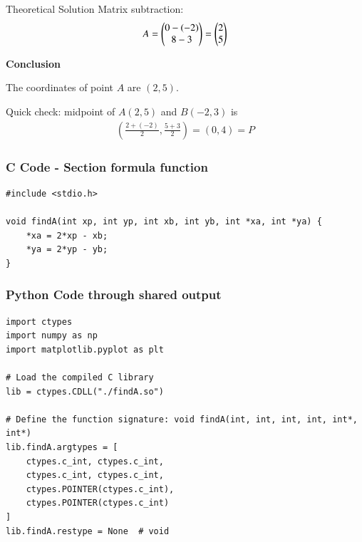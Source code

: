 \documentclass{beamer}
\begin{document}
\begin{frame}{Theoretical Solution}
    Matrix subtraction:  
\begin{align*}
A = \begin{pmatrix}0 - (-2) \\ 8 - 3\end{pmatrix} 
= \begin{pmatrix}2 \\ 5\end{pmatrix}    
\end{align*}



\textbf{Conclusion} 

The coordinates of point $A$ are $(2,5)$.  

Quick check: midpoint of $A(2,5)$ and $B(-2,3)$ is  
\begin{align*}
    \left(\frac{2+(-2)}{2}, \frac{5+3}{2}\right) = (0,4) = P
\end{align*}
\end{frame}

\begin{frame}[fragile]
\frametitle{C Code - Section formula function}
\begin{lstlisting}
#include <stdio.h>

void findA(int xp, int yp, int xb, int yb, int *xa, int *ya) {
    *xa = 2*xp - xb;
    *ya = 2*yp - yb;
}
\end{lstlisting}
\end{frame}

\begin{frame}[fragile]
	\frametitle{Python Code through shared output}
	\begin{lstlisting}
import ctypes
import numpy as np
import matplotlib.pyplot as plt

# Load the compiled C library
lib = ctypes.CDLL("./findA.so")

# Define the function signature: void findA(int, int, int, int, int*, int*)
lib.findA.argtypes = [
    ctypes.c_int, ctypes.c_int,
    ctypes.c_int, ctypes.c_int,
    ctypes.POINTER(ctypes.c_int),
    ctypes.POINTER(ctypes.c_int)
]
lib.findA.restype = None  # void
\end{lstlisting}
\end{frame}
\end{document}
